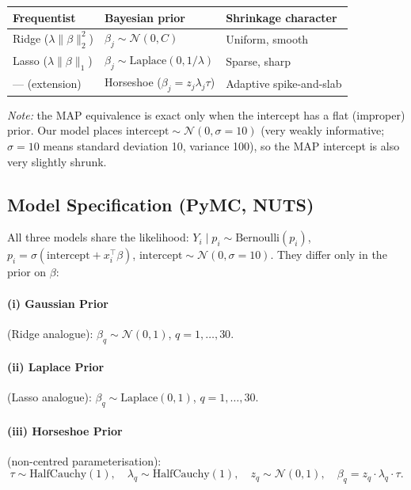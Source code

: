 \documentclass[10pt, letterpaper]{article}
\begin{document}
\begin{center}\small
\renewcommand{\arraystretch}{1.2}
\begin{tabular}{@{}lll@{}}
\toprule
Frequentist & Bayesian prior & Shrinkage character \\
\midrule
Ridge ($\lambda \|\beta\|_2^2$) & $\beta_j \sim \mathcal{N}(0, C)$ & Uniform, smooth \\
Lasso ($\lambda \|\beta\|_1$) & $\beta_j \sim \text{Laplace}(0, 1/\lambda)$ & Sparse, sharp \\
--- (extension) & Horseshoe ($\beta_j = z_j \lambda_j \tau$) & Adaptive spike-and-slab \\
\bottomrule
\end{tabular}
\end{center}

\emph{Note:} the MAP equivalence is exact only when the intercept has a flat (improper) prior. Our model places $\text{intercept} \sim \mathcal{N}(0, \sigma = 10)$ (very weakly informative; $\sigma = 10$ means standard deviation 10, variance 100), so the MAP intercept is also very slightly shrunk.

\subsection{Model Specification (PyMC, NUTS)}
All three models share the likelihood: $Y_i \mid p_i \sim \text{Bernoulli}(p_i)$, $p_i = \sigma(\text{intercept} + x_i^\top \beta)$, $\text{intercept} \sim \mathcal{N}(0, \sigma = 10)$. They differ only in the prior on $\beta$:

\paragraph{(i) Gaussian Prior} (Ridge analogue): $\beta_q \sim \mathcal{N}(0, 1)$, $q = 1, \dots, 30$.
\paragraph{(ii) Laplace Prior} (Lasso analogue): $\beta_q \sim \text{Laplace}(0, 1)$, $q = 1, \dots, 30$.
\paragraph{(iii) Horseshoe Prior} (non-centred parameterisation):
\[
\tau \sim \text{HalfCauchy}(1), \quad \lambda_q \sim \text{HalfCauchy}(1), \quad z_q \sim \mathcal{N}(0, 1), \quad \beta_q = z_q \cdot \lambda_q \cdot \tau.
\]
\end{document}
